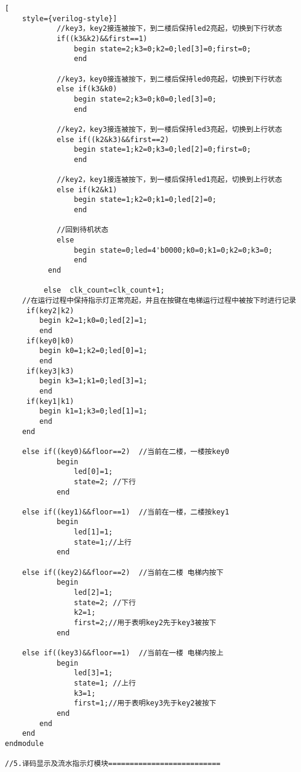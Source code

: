 \begin{lstlisting}[
    style={verilog-style}]
            //key3，key2接连被按下，到二楼后保持led2亮起，切换到下行状态
            if((k3&k2)&&first==1) 
                begin state=2;k3=0;k2=0;led[3]=0;first=0;
                end

            //key3，key0接连被按下，到二楼后保持led0亮起，切换到下行状态
            else if(k3&k0) 
                begin state=2;k3=0;k0=0;led[3]=0;
                end

            //key2，key3接连被按下，到一楼后保持led3亮起，切换到上行状态
            else if((k2&k3)&&first==2) 
                begin state=1;k2=0;k3=0;led[2]=0;first=0;
                end

            //key2，key1接连被按下，到一楼后保持led1亮起，切换到上行状态
            else if(k2&k1) 
                begin state=1;k2=0;k1=0;led[2]=0;
                end

            //回到待机状态
            else  
                begin state=0;led=4'b0000;k0=0;k1=0;k2=0;k3=0;
                end 
          end 

         else  clk_count=clk_count+1;
    //在运行过程中保持指示灯正常亮起，并且在按键在电梯运行过程中被按下时进行记录
     if(key2|k2)
        begin k2=1;k0=0;led[2]=1;
        end
     if(key0|k0) 
        begin k0=1;k2=0;led[0]=1;
        end
     if(key3|k3) 
        begin k3=1;k1=0;led[3]=1;
        end
     if(key1|k1) 
        begin k1=1;k3=0;led[1]=1;
        end
    end
        
    else if((key0)&&floor==2)  //当前在二楼，一楼按key0
            begin
                led[0]=1; 
                state=2; //下行                         
            end
                                
    else if((key1)&&floor==1)  //当前在一楼，二楼按key1
            begin
                led[1]=1;
                state=1;//上行
            end
     
    else if((key2)&&floor==2)  //当前在二楼 电梯内按下 
            begin
                led[2]=1;
                state=2; //下行
                k2=1;
                first=2;//用于表明key2先于key3被按下
            end 
                                 
    else if((key3)&&floor==1)  //当前在一楼 电梯内按上  
            begin
                led[3]=1;
                state=1; //上行 
                k3=1;
                first=1;//用于表明key3先于key2被按下
            end
        end
    end
endmodule

//5.译码显示及流水指示灯模块==========================


\end{lstlisting}
